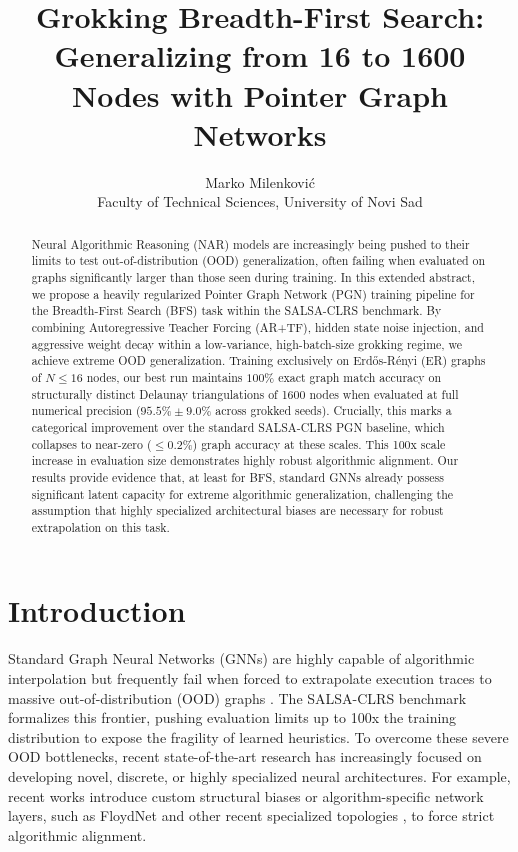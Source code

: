 \documentclass{article}
\title{Grokking Breadth-First Search: Generalizing from 16 to 1600 Nodes with Pointer Graph Networks}
\author[M. Milenkovi\'{c}]{%
  Marko Milenkovi\'{c} \\
  Faculty of Technical Sciences, University of Novi Sad\\
  \email{mmarkomile@gmail.com}
}
\begin{document}
\maketitle

\begin{abstract}
Neural Algorithmic Reasoning (NAR) models are increasingly being pushed to their limits to test out-of-distribution (OOD) generalization, often failing when evaluated on graphs significantly larger than those seen during training. In this extended abstract, we propose a heavily regularized Pointer Graph Network (PGN) training pipeline for the Breadth-First Search (BFS) task within the SALSA-CLRS benchmark. By combining Autoregressive Teacher Forcing (AR+TF), hidden state noise injection, and aggressive weight decay within a low-variance, high-batch-size grokking regime, we achieve extreme OOD generalization. Training exclusively on Erd\H{o}s-R\'{e}nyi (ER) graphs of $N \le 16$ nodes, our best run maintains $100\%$ exact graph match accuracy on structurally distinct Delaunay triangulations of 1600 nodes when evaluated at full numerical precision ($95.5\% \pm 9.0\%$ across grokked seeds). Crucially, this marks a categorical improvement over the standard SALSA-CLRS PGN baseline, which collapses to near-zero ($\le 0.2\%$) graph accuracy at these scales. This 100x scale increase in evaluation size demonstrates highly robust algorithmic alignment. Our results provide evidence that, at least for BFS, standard GNNs already possess significant latent capacity for extreme algorithmic generalization, challenging the assumption that highly specialized architectural biases are necessary for robust extrapolation on this task.
\end{abstract}

\section{Introduction}

Standard Graph Neural Networks (GNNs) \cite{velickovic2020pointer} are highly capable of algorithmic interpolation but frequently fail when forced to extrapolate execution traces to massive out-of-distribution (OOD) graphs \cite{velickovic2022clrs}. The SALSA-CLRS benchmark \cite{minder2023salsa} formalizes this frontier, pushing evaluation limits up to 100x the training distribution to expose the fragility of learned heuristics. To overcome these severe OOD bottlenecks, recent state-of-the-art research has increasingly focused on developing novel, discrete, or highly specialized neural architectures. For example, recent works introduce custom structural biases or algorithm-specific network layers, such as FloydNet \cite{floydnet} and other recent specialized topologies \cite{rodionov2025discrete}, to force strict algorithmic alignment. 
\end{document}
